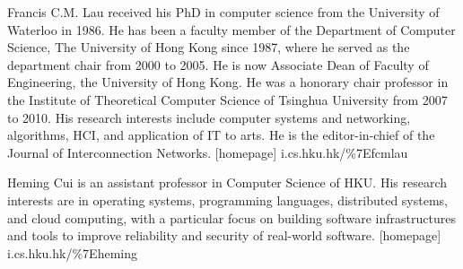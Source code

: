 \documentclass[10pt,journal,compsoc]{IEEEtran}
\begin{document}
\begin{IEEEbiography}{Francis C.M. Lau}
received his PhD in computer science from the University of Waterloo in 1986. He has been a faculty member of the Department of Computer Science, The University of Hong Kong since 1987, where he served as the department chair from 2000 to 2005. He is now Associate Dean of Faculty of Engineering, the University of Hong Kong. He was a honorary chair professor in the Institute of Theoretical Computer Science of Tsinghua University from 2007 to 2010. His research interests include
computer systems and networking, algorithms, HCI, and application of IT to arts. He is the editor-in-chief of the Journal of Interconnection Networks.
[homepage] i.cs.hku.hk/\%7Efcmlau
\end{IEEEbiography}

\begin{IEEEbiography}{Heming Cui}
is an assistant professor in Computer Science of HKU. His research interests are in operating systems, programming languages, distributed systems, and cloud computing, with a particular focus on building software infrastructures and tools to improve reliability and security of real-world software. 
[homepage] i.cs.hku.hk/\%7Eheming
\end{IEEEbiography}
\end{document}
